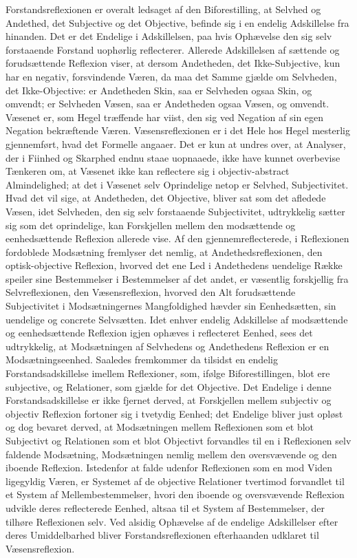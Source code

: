 \documentclass[11pt]{book}
\newcommand{\opage}[1]{\marginnote{\footnotesize\textit{[#1]}}}
\begin{document}
Forstandsreflexionen er overalt ledsaget af den Biforestilling, at Selvhed og Andethed, det Subjective og det Objective, befinde sig i en endelig Adskillelse fra hinanden. Det er det Endelige i Adskillelsen, paa hvis Ophævelse den sig selv forstaaende Forstand uophørlig reflecterer. Allerede Adskillelsen af sættende og forudsættende Reflexion viser, at dersom Andetheden, det Ikke-Subjective, kun har en negativ, forsvindende Væren, da maa det Samme gjælde om Selvheden, det Ikke-Objective: er Andetheden Skin, saa er Selvheden ogsaa Skin, og omvendt; er Selvheden Væsen, saa er Andetheden ogsaa Væsen, og omvendt. Væsenet er, som Hegel træffende har viist, den sig ved Negation af sin egen Negation bekræftende Væren. Væsensreflexionen er i det Hele hos Hegel mesterlig gjennemført, hvad det Formelle angaaer. Det er kun at undres over, at Analyser, der i Fiinhed og Skarphed endnu staae uopnaaede, ikke have kunnet overbevise Tænkeren om, at Væsenet ikke kan reflectere sig i objectiv-abstract Almindelighed; at det i Væsenet selv Oprindelige netop er Selvhed, Subjectivitet. Hvad det vil sige, at Andetheden, det Objective, bliver sat som det afledede Væsen, idet Selvheden, den sig selv forstaaende Subjectivitet, udtrykkelig sætter sig som det oprindelige, kan Forskjellen mellem den modsættende og eenhedsættende Reflexion allerede vise. Af den gjennemreflecterede, i Reflexionen fordoblede Modsætning fremlyser det nemlig, at Andethedsreflexionen, den optisk-objective Reflexion, hvorved det ene Led i Andethedens uendelige Række speiler sine Bestemmelser i Bestemmelser af det andet, er væsentlig forskjellig
\opage{77} \setcounter{footnote}{0}%
fra Selvreflexionen, den Væsensreflexion, hvorved den Alt forudsættende Subjectivitet i Modsætningernes Mangfoldighed hævder sin Eenhedsætten, sin uendelige og concrete Selvsætten. Idet enhver endelig Adskillelse af modsættende og eenhedsættende Reflexion igjen ophæves i reflecteret Eenhed, sees det udtrykkelig, at Modsætningen af Selvhedens og Andethedens Reflexion er en Modsætningseenhed. Saaledes fremkommer da tilsidst en endelig Forstandsadskillelse imellem Reflexioner, som, ifølge Biforestillingen, blot ere subjective, og Relationer, som gjælde for det Objective. Det Endelige i denne Forstandsadskillelse er ikke fjernet derved, at Forskjellen mellem subjectiv og objectiv Reflexion fortoner sig i tvetydig Eenhed; det Endelige bliver just opløst og dog bevaret derved, at Modsætningen mellem Reflexionen som et blot Subjectivt og Relationen som et blot Objectivt forvandles til en i Reflexionen selv faldende Modsætning, Modsætningen nemlig mellem den oversvævende og den iboende Reflexion. Istedenfor at falde udenfor Reflexionen som en mod Viden ligegyldig Væren, er Systemet af de objective Relationer tvertimod forvandlet til et System af Mellembestemmelser, hvori den iboende og oversvævende Reflexion udvikle deres reflecterede Eenhed, altsaa til et System af Bestemmelser, der tilhøre Reflexionen selv. Ved alsidig Ophævelse af de endelige Adskillelser efter deres Umiddelbarhed bliver Forstandsreflexionen efterhaanden udklaret til Væsensreflexion.
\end{document}

